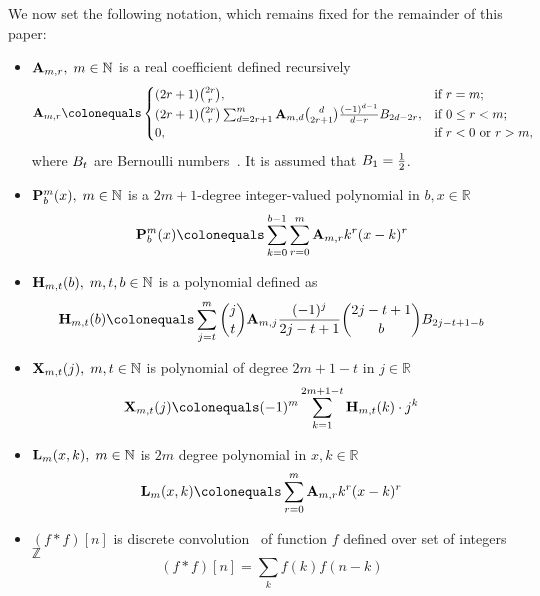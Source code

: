 We now set the following notation, which remains fixed for the remainder of this paper:
\begin{itemize}
    \item ${\mathbf{A}} \sb{m,r}, \; m\in\mathbb{N}$ is a real coefficient defined recursively
    \begin{equation}
        \label{eq:def_coeff_a}
        \coeffA{m}{r} \colonequals
        \begin{cases}
        (2r+1)
            \binom{2r}{r}, & \text{if } r=m; \\
            (2r+1) \binom{2r}{r} \sum_{d=2r+1}^{m} \coeffA{m}{d} \binom{d}{2r+1} \frac{(-1)^{d-1}}{d-r}
            \bernoulli{2d-2r}, & \text{if } 0 \leq r<m; \\
            0, & \text{if } r<0 \text{ or } r>m,
        \end{cases}
    \end{equation}
    where ${B}\sb{t}$ are Bernoulli numbers~\cite{WeissteinBernoulli}.
    It is assumed that ${B}\sb{1}=\frac{1}{2}$.

    \item ${\mathbf{P}}\sp{m} \sb{b}(x), \; m\in\mathbb{N}$ is a $2m+1$-degree integer-valued polynomial in $b,x\in\mathbb{R}$
    \begin{equation}
        \label{eq:def_polynomial_p}
        \polynomialP{m}{b}{x} \colonequals \sum_{k=0}^{b-1} \sum_{r=0}^{m} \coeffA{m}{r} k^r(x-k)^r
    \end{equation}

    \item ${\mathbf{H}} \sb{m,t} (b), \; m,t,b\in\mathbb{N}$ is a polynomial defined as
    \begin{equation}
        \label{eq:def_coeff_h}
        \coeffH{m}{t}{b}
        \colonequals
        \sum_{j=t}^{m} \binom{j}{t} \coeffA{m}{j} \frac{(-1)^j}{2j-t+1} \binom{2j-t+1}{b} \bernoulli{2j-t+1-b}
    \end{equation}

    \item ${\mathbf{X}}\sb{m,t} (j), \; m,t\in\mathbb{N}$ is polynomial of degree $2m+1-t$ in $j\in\mathbb{R}$
    \begin{equation}
        \label{eq:def_coeff_x}
        \polynomialX{m}{t}{j} \colonequals (-1)^m \sum_{k=1}^{2m+1-t} \coeffH{m}{t}{k} \cdot j^k
    \end{equation}

    \item ${\mathbf{L}}\sb{m}(x,k), \; m\in\mathbb{N}$ is $2m$ degree polynomial in $x,k\in\mathbb{R}$
    \begin{equation}
        \label{eq:def_polynomial_l}
        \polynomialL{m}{x}{k} \colonequals \sum_{r=0}^{m} \coeffA{m}{r} k^r(x-k)^r
    \end{equation}

    \item $(f\ast f)[n]$ is discrete convolution~\cite{DiscConv} of function $f$ defined over set of integers $\mathbb{Z}$
    \[
        (f\ast f)[n] = \sum_{k} f(k) f(n-k)
    \]


\end{itemize}

